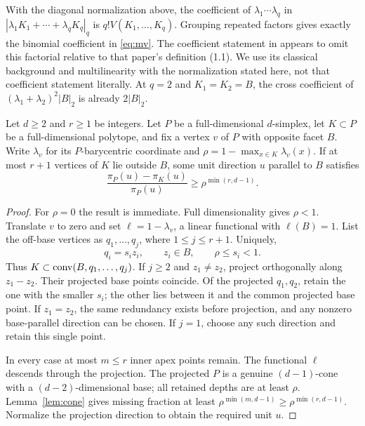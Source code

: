 \begin{remark}\label{rem:factorial}
With the diagonal normalization above, the coefficient of
$\lambda_1\cdots\lambda_q$ in
$|\lambda_1K_1+\cdots+\lambda_qK_q|_q$ is
$q!V(K_1,\ldots,K_q)$. Grouping repeated factors gives exactly the binomial
coefficient in \eqref{eq:mv}. The coefficient statement in
\cite[Theorem 2.1, version 2]{BS} appears to omit this factorial relative
to that paper's definition (1.1). We use its classical background and
multilinearity with the normalization stated here, not that coefficient
statement literally. At $q=2$ and $K_1=K_2=B$, the cross coefficient of
$(\lambda_1+\lambda_2)^2|B|_2$ is already $2|B|_2$.
\end{remark}

\begin{lemma}\label{lem:collapse}
Let $d\ge2$ and $r\ge1$ be integers. Let $P$ be a full-dimensional
$d$-simplex, let $K\subset P$ be a full-dimensional polytope, and fix a
vertex $v$ of $P$ with opposite facet $B$. Write $\lambda_v$ for its
$P$-barycentric coordinate and
$\rho=1-\max_{x\in K}\lambda_v(x)$. If at most $r+1$ vertices of $K$
lie outside $B$, some unit direction $u$ parallel to $B$ satisfies
\begin{equation}\label{eq:collapse}
 \frac{\pi_P(u)-\pi_K(u)}{\pi_P(u)}\ge\rho^{\min(r,d-1)}.
\end{equation}
\end{lemma}
\begin{proof}
For $\rho=0$ the result is immediate. Full dimensionality gives $\rho<1$.
Translate $v$ to zero and set $\ell=1-\lambda_v$, a linear functional
with $\ell(B)=1$. List the off-base vertices as $q_1,\ldots,q_j$,
where $1\le j\le r+1$. Uniquely,
\[
 q_i=s_i z_i,\qquad z_i\in B,\qquad \rho\le s_i<1.
\]
Thus $K\subset\operatorname{conv}(B,q_1,\ldots,q_j)$.
If $j\ge2$ and $z_1\ne z_2$, project orthogonally along $z_1-z_2$.
Their projected base points coincide. Of the projected $q_1,q_2$, retain
the one with the smaller $s_i$; the other lies between it and the common
projected base point. If $z_1=z_2$, the same redundancy exists before
projection, and any nonzero base-parallel direction can be chosen.
If $j=1$, choose any such direction and retain this single point.

In every case at most $m\le r$ inner apex points remain. The functional
$\ell$ descends through the projection. The projected $P$ is a genuine
$(d-1)$-cone with a $(d-2)$-dimensional base; all retained depths are at
least $\rho$. Lemma~\ref{lem:cone} gives missing fraction at least
$\rho^{\min(m,d-1)}\ge\rho^{\min(r,d-1)}$. Normalize the projection
direction to obtain the required unit $u$.
\end{proof}

